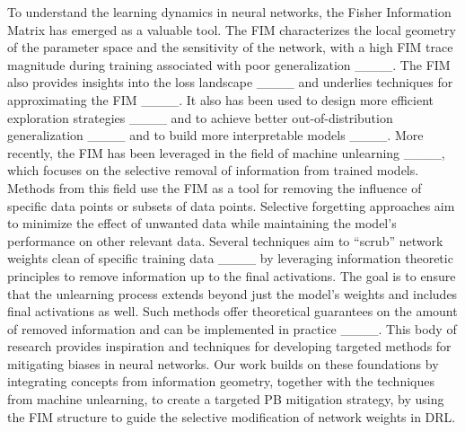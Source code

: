 To understand the learning dynamics in neural networks, the Fisher Information Matrix has emerged as a valuable tool. The FIM characterizes the local geometry of the parameter space and the sensitivity of the network, with a high FIM trace magnitude during training associated with poor generalization ____. The FIM also provides insights into the loss landscape ____ and underlies techniques for approximating the FIM ____. It also has been used to design more efficient exploration strategies ____ and to achieve better out-of-distribution generalization ____ and to build more interpretable models ____. More recently, the FIM has been leveraged in the field of machine unlearning ____, which focuses on the selective removal of information from trained models. Methods from this field use the FIM as a tool for removing the influence of specific data points or subsets of data points. Selective forgetting approaches aim to minimize the effect of unwanted data while maintaining the model's performance on other relevant data. Several techniques aim to “scrub” network weights clean of specific training data ____ by leveraging information theoretic principles to remove information up to the final activations. The goal is to ensure that the unlearning process extends beyond just the model's weights and includes final activations as well. Such methods offer theoretical guarantees on the amount of removed information and can be implemented in practice ____. This body of research provides inspiration and techniques for developing targeted methods for mitigating biases in neural networks. Our work builds on these foundations by integrating concepts from information geometry, together with the techniques from machine unlearning, to create a targeted PB mitigation strategy, by using the FIM structure to guide the selective modification of network weights in DRL.